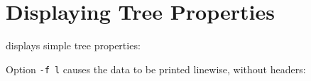 \section{Displaying Tree Properties}
\label{sct_stats}

\stats{} displays simple tree properties:
\begin{center}


\end{center}

\noindent{}Option \texttt{-f l} causes the data to be printed linewise, without
headers:

\begin{center}


\end{center}
